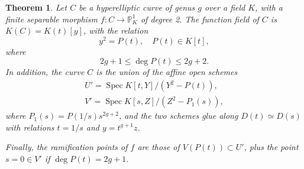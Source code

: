 \documentclass[a4paper, 12pt]{amsart}
\theoremstyle{definition}
\theoremstyle{plain}
\theoremstyle{plain}
\newtheorem{thm0}[defn0]{Theorem}
\theoremstyle{plain}
\theoremstyle{plain}
\theoremstyle{remark}
\theoremstyle{remark}
\theoremstyle{plain}
\newenvironment{theorem}{ \begin{thm0}}{\end{thm0}}
\DeclareMathOperator{\Spec}{Spec}
\begin{document}
	\begin{theorem}\label{hyperelliptic}
		Let $C$ be a hyperelliptic curve of genus $g$ over a field $K$, with a finite separable morphism $f:C\rightarrow\mathbb{P}^1_K$ of degree 2. The function field of $C$ is $K(C)=K(t)[y]$, with the relation
		\begin{equation}\label{hyperellipticequation}
			y^2=P(t),\quad P(t)\in K[t],
		\end{equation}
		where
		\begin{equation*}
			2g+1\le \deg P(t)\le 2g+2.
		\end{equation*}
		In addition, the curve $C$ is the union of the affine open schemes
		\begin{align*}
			U'=\Spec K[t,Y]/(Y^2-P(t)),\\
			V'=\Spec K[s,Z]/(Z^2-P_1(s)),
		\end{align*}
		where $P_1(s)=P(1/s)s^{2g+2}$, and the two schemes glue along $D(t)\simeq D(s)$ with relations $t=1/s$ and $y=t^{g+1}z$.
		
		Finally, the ramification points of $f$ are those of $V(P(t))\subset U'$, plus the point ${s=0}\in V'$ if $\deg P(t)=2g+1$.
	\end{theorem}
\end{document}
